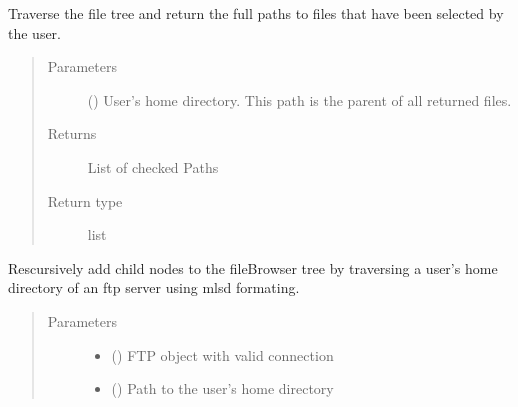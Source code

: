 \documentclass[letterpaper,10pt,english]{sphinxmanual}
\begin{document}
\begin{fulllineitems}
\begin{fulllineitems}
\label{\detokenize{polo.widgets:polo.widgets.file_browser.fileBrowser.get_checked_files}}
Traverse the file tree and return the full paths to files that have
been selected by the user.
\begin{quote}\begin{description}
\item[{Parameters}] \leavevmode
{} () \textendash{} User’s home directory. This path is the parent of all
returned files.

\item[{Returns}] \leavevmode
List of checked Paths

\item[{Return type}] \leavevmode
list

\end{description}\end{quote}

\end{fulllineitems}


\begin{fulllineitems}
\label{\detokenize{polo.widgets:polo.widgets.file_browser.fileBrowser.grow_tree_using_mlsd}}
Rescursively add child nodes to the fileBrowser tree by traversing
a user’s home directory of an ftp server using mlsd formating.
\begin{quote}\begin{description}
\item[{Parameters}] \leavevmode\begin{itemize}
\item {} 
 () \textendash{} FTP object with valid connection

\item {} 
 () \textendash{} Path to the user’s home directory


\end{itemize}
\end{description}
\end{quote}
\end{fulllineitems}
\end{fulllineitems}
\end{document}
